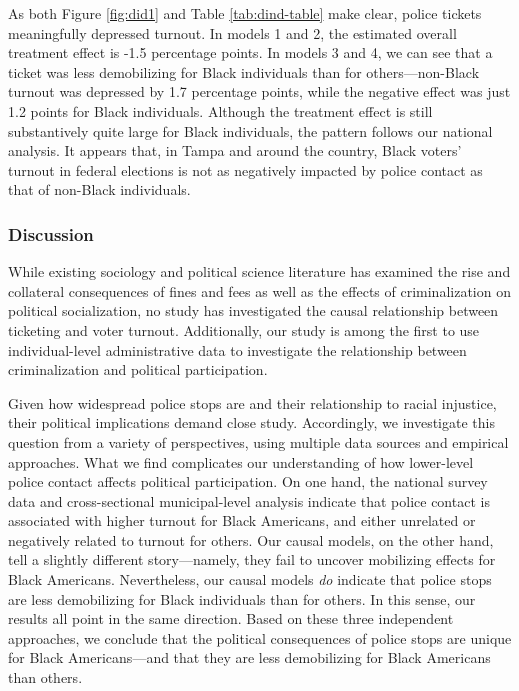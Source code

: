 \documentclass[
  12pt,
]{article}
\begin{document}
As both Figure \ref{fig:did1} and Table \ref{tab:dind-table} make clear, police tickets meaningfully depressed turnout. In models 1 and 2, the estimated overall treatment effect is -1.5 percentage points. In models 3 and 4, we can see that a ticket was less demobilizing for Black individuals than for others---non-Black turnout was depressed by 1.7 percentage points, while the negative effect was just 1.2 points for Black individuals. Although the treatment effect is still substantively quite large for Black individuals, the pattern follows our national analysis. It appears that, in Tampa and around the country, Black voters' turnout in federal elections is not as negatively impacted by police contact as that of non-Black individuals.

\hypertarget{discussion}{%
\subsubsection*{Discussion}\label{discussion}}

While existing sociology and political science literature has examined the rise and collateral consequences of fines and fees as well as the effects of criminalization on political socialization, no study has investigated the causal relationship between ticketing and voter turnout. Additionally, our study is among the first to use individual-level administrative data to investigate the relationship between criminalization and political participation.

Given how widespread police stops are and their relationship to racial injustice, their political implications demand close study. Accordingly, we investigate this question from a variety of perspectives, using multiple data sources and empirical approaches. What we find complicates our understanding of how lower-level police contact affects political participation. On one hand, the national survey data and cross-sectional municipal-level analysis indicate that police contact is associated with higher turnout for Black Americans, and either unrelated or negatively related to turnout for others. Our causal models, on the other hand, tell a slightly different story---namely, they fail to uncover mobilizing effects for Black Americans. Nevertheless, our causal models \emph{do} indicate that police stops are less demobilizing for Black individuals than for others. In this sense, our results all point in the same direction. Based on these three independent approaches, we conclude that the political consequences of police stops are unique for Black Americans---and that they are less demobilizing for Black Americans than others.
\end{document}
